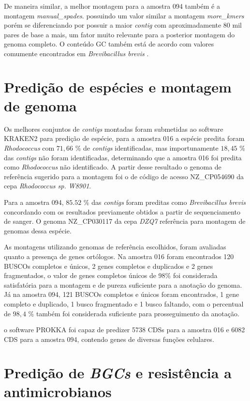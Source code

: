 De maneira similar, a melhor montagem para a amostra 094 também é a montagem \textit{manual\_spades}.
possuindo um valor similar a montagem \textit{more\_kmers} porém se diferenciando por possuir a maior \textit{contig}
com aproximadamente 80 mil pares de base a mais, um fator muito relevante para a posterior montagem do genoma completo.
O conteúdo GC também está de acordo com valores comumente encontrados em \textit{Brevibacillus brevis} \cite{nakamura1991bacillus}.

\section{Predição de espécies e montagem de genoma}

Os melhores conjuntos de \textit{contigs} montadas foram submetidas ao software KRAKEN2 para predição de espécie,
para a amostra 016 a espécie predita foram \textit{Rhodococcus} com $71,66$ \% de \textit{contigs} identificadas, mas importunamente
$18,45$ \% das \textit{contigs} não foram identificadas, determinando que a amostra 016 foi predita como \textit{Rhodococcus}
não identificado. A partir desse resultado o genoma de referência sugerido para a montagem foi o de código
de acesso NZ\_CP054690 da cepa \textit{Rhodococcus sp. W8901}. 

Para a amostra 094, $85.52$ \% das \textit{contigs} foram preditas como \textit{Brevibacillus brevis}
concordando com os resultados previamente obtidos a partir de sequenciamento de sanger. O genoma NZ\_CP030117
da cepa \textit{DZQ7} referência para montagem de genomas dessa espécie.

As montagens utilizando genomas de referência escolhidos, foram avaliadas quanto a presença de genes 
ortólogos. Na amostra 016 foram encontrados 120 BUSCOs completos e únicos, 2 genes completos e duplicados e 2 genes fragmentados,
 o valor de genes completos únicos de 98\% foi considerada satisfatória para a montagem e de pureza suficiente para
a anotação do genoma. Já na amostra 094, 121 BUSCOs completos e únicos foram encontrados, 1 gene completo e duplicado, 1 busco fragmentado
e 1 busco faltando, com o percentual de $98,4$ \% também foi considerada suficiente para prosseguimento da anotação.

o software PROKKA foi capaz de predizer 5738 CDSs para a amostra 016 e 6082 CDS para a amostra 094, contendo genes
de diversas funções celulares. 

\section{Predição de \textit{BGCs} e resistência a antimicrobianos}

